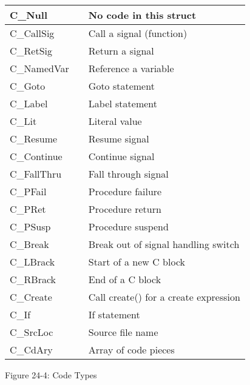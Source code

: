 \begin{center}
\tabletail{}
\tablelasttail{}
\begin{supertabular}{|m{0.9906598in}|m{0.42545983in}|m{2.42956in}|}
\hline
{\ttfamily C\_Null} &
 &
 No code in this struct\\\hline
{\ttfamily C\_CallSig} &
 &
 Call a signal (function)\\\hline
 C\_RetSig &
 &
 Return a signal\\\hline
 C\_NamedVar &
 &
 Reference a variable\\\hline
 C\_Goto &
 &
 Goto statement\\\hline
 C\_Label &
 &
 Label statement\\\hline
 C\_Lit &
 &
 Literal value\\\hline
 C\_Resume &
 &
 Resume signal\\\hline
 C\_Continue &
 &
 Continue signal\\\hline
 C\_FallThru &
 &
 Fall through signal\\\hline
 C\_PFail &
 &
 Procedure failure\\\hline
 C\_PRet &
 &
 Procedure return\\\hline
 C\_PSusp &
 &
 Procedure suspend\\\hline
 C\_Break &
 &
 Break out of signal handling switch\\\hline
 C\_LBrack &
 &
 Start of a new C block\\\hline
 C\_RBrack &
 &
 End of a C block\\\hline
 C\_Create &
 &
 Call create() for a create expression\\\hline
 C\_If &
 &
 If statement\\\hline
 C\_SrcLoc &
 &
 Source file name\\\hline
 C\_CdAry &
 &
 Array of code pieces\\\hline
\end{supertabular}
\end{center}
{\centering{}
Figure 24-4: Code Types
\par}


